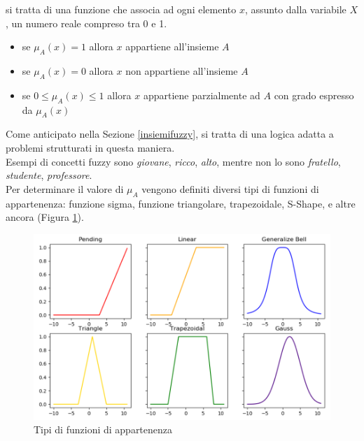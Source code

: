 \documentclass[12pt]{report}
\theoremstyle{definition}
\begin{document}
si tratta di una funzione che associa ad ogni elemento $x$, assunto dalla variabile $X$, un numero reale compreso tra 0 e 1.
\begin{itemize}
    \item se $\mu_A(x) = 1$ allora $x$ appartiene all'insieme $A$
    \item se $\mu_A(x) = 0$ allora $x$ non appartiene all'insieme $A$
    \item se $0 \leq \mu_A(x) \leq 1$ allora $x$ appartiene parzialmente ad $A$ con grado espresso da $\mu_A(x)$
\end{itemize}
Come anticipato nella Sezione \ref{insiemifuzzy}, si tratta di una logica adatta a problemi strutturati in questa maniera.
\\
Esempi di concetti fuzzy sono \textit{giovane}, \textit{ricco}, \textit{alto}, mentre non lo sono \textit{fratello}, \textit{studente}, \textit{professore}.
\\
Per determinare il valore di $\mu_A$ vengono definiti diversi tipi di funzioni di appartenenza: funzione sigma, funzione triangolare, trapezoidale, S-Shape, e altre ancora (Figura \ref{membership_functions}). 
\\
\begin{figure}[!h]
    \centering
    \includegraphics[scale = 0.7]{images/membership_functions.png}
    \caption{Tipi di funzioni di appartenenza}
    \label{membership_functions}
\end{figure}
\\
\end{document}
